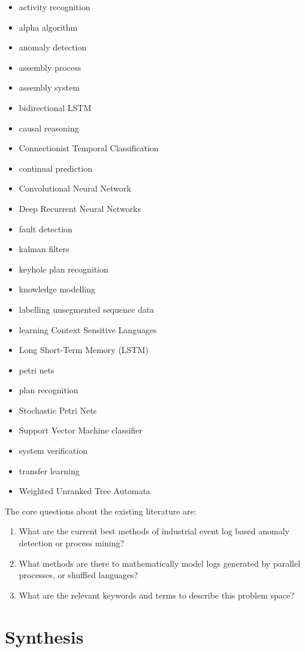 \documentclass[a4paper,10pt]{article}
\begin{document}
\begin{itemize}
 \item activity recognition
 \item alpha algorithm
 \item anomaly detection
 \item assembly process
 \item assembly system
 \item bidirectional LSTM
 \item causal reasoning
 \item Connectionist Temporal Classification
 \item continual prediction
 \item Convolutional Neural Network
 \item Deep Recurrent Neural Networks
 \item fault detection
 \item kalman filters
 \item keyhole plan recognition
 \item knowledge modelling
 \item labelling unsegmented sequence data
 \item learning Context Sensitive Languages
 \item Long Short-Term Memory (LSTM)
 \item petri nets
 \item plan recognition
 \item Stochastic Petri Nets
 \item Support Vector Machine classifier
 \item system verification
 \item transfer learning
 \item Weighted Unranked Tree Automata
\end{itemize}

The core questions about the existing literature are:
\begin{enumerate}
 \item What are the current best methods of industrial event log based anomaly detection or process mining?
 \item What methods are there to mathematically model logs generated by parallel processes, or shuffled languages?
 \item What are the relevant keywords and terms to describe this problem space?
\end{enumerate}

\section{Synthesis}



\end{document}
